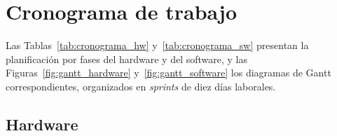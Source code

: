 \section{Cronograma de trabajo}
\label{anx:cronograma}

Las Tablas~\ref{tab:cronograma_hw} y~\ref{tab:cronograma_sw} presentan la
planificación por fases del hardware y del software, y las
Figuras~\ref{fig:gantt_hardware} y~\ref{fig:gantt_software} los diagramas de
Gantt correspondientes, organizados en \emph{sprints} de diez días laborales.

\subsection{Hardware}

